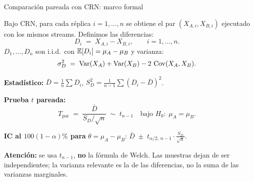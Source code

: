 \documentclass[aspectratio=1610, 10pt]{beamer}
\newcommand{\Cov}{\operatorname{Cov}}
\begin{document}
\begin{frame}{Comparación pareada con CRN: marco formal}
\begin{definicionbox}
Bajo CRN, para cada réplica $i=1,\ldots,n$ se obtiene el par $(X_{A,i}, X_{B,i})$ ejecutado con los mismos streams. Definimos las diferencias:
\[
D_i \;=\; X_{A,i} - X_{B,i}, \qquad i=1,\ldots,n.
\]
$D_1, \ldots, D_n$ son i.i.d.\ con $\mathbb{E}[D_i] = \mu_A - \mu_B$ y varianza:
\[
\sigma_D^2 \;=\; \Var(X_A) + \Var(X_B) - 2\,\Cov(X_A, X_B).
\]
\end{definicionbox}

\vspace{0.2cm}
\textbf{Estadístico:} \quad $\bar D = \tfrac{1}{n}\sum D_i$, \quad $S_D^2 = \tfrac{1}{n-1}\sum (D_i-\bar D)^2$.

\textbf{Prueba $t$ pareada:}
\[
T_{\text{par}} \;=\; \frac{\bar D}{S_D/\sqrt{n}} \;\sim\; t_{n-1} \quad \text{bajo } H_0:\;\mu_A=\mu_B.
\]

\textbf{IC al $100(1-\alpha)\%$ para} $\theta=\mu_A-\mu_B$: \quad
$\displaystyle \bar D \;\pm\; t_{\alpha/2,\,n-1}\cdot\frac{S_D}{\sqrt{n}}$.

\vspace{0.2cm}
\textbf{Atención:} se usa $t_{n-1}$, \textbf{no} la fórmula de Welch. Las muestras dejan de ser independientes; la varianza relevante es la de las diferencias, no la suma de las varianzas marginales.
\end{frame}
\end{document}
